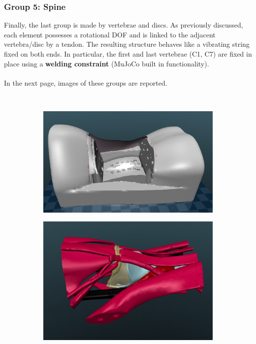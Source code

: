 \documentclass[a4paper, 12pt]{article}
\begin{document}
\subsubsection{Group 5: Spine}
Finally, the last group is made by vertebrae and discs. As previously discussed, each element possesses a rotational DOF and is linked to the adjacent vertebra/disc by a tendon. The resulting structure behaves like a vibrating string fixed on both ends. In particular, the first and last vertebrae (C1, C7) are fixed in place using a \textbf{welding constraint} (MuJoCo built in functionality).
\\\\In the next page, images of these groups are reported.
\clearpage
\begin{figure}[h!]{}\
\centering
    \begin{subfigure}[t]{0.5\textwidth}
\includegraphics[width=\textwidth]{Figures/fig08a.pdf}
           \label{fig:fig08a}
    \end{subfigure}
    \begin{subfigure}[t]{0.45\textwidth}
    \includegraphics[width=\textwidth]{Figures/fig08b.pdf}

\end{subfigure}
\end{figure}
\end{document}
